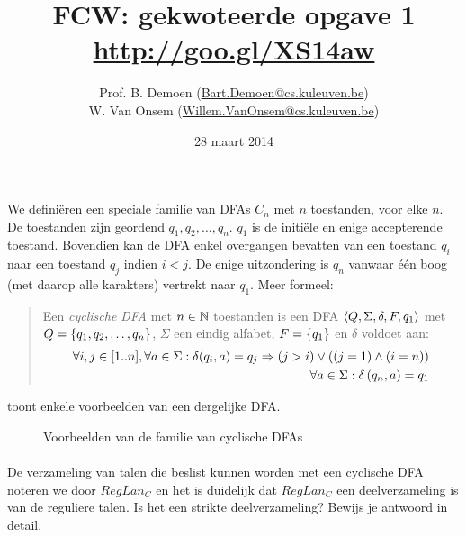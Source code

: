 \documentclass{article}
\title{FCW: gekwoteerde opgave 1\\\url{http://goo.gl/XS14aw}}
\author{Prof. B. Demoen (\url{Bart.Demoen@cs.kuleuven.be})\\ W. Van Onsem (\url{Willem.VanOnsem@cs.kuleuven.be})}
\date{28 maart 2014}
\begin{document}
\maketitle
\richtlijnen{}
\aboutanswers{}
\begin{question}[] We defini\"{e}ren een speciale familie van DFAs
$C_n$ met $n$ toestanden, voor elke $n$. De toestanden zijn geordend
$q_1,q_2,\ldots,q_n$. $q_1$ is de initi\"ele en enige accepterende
toestand. Bovendien kan de DFA enkel overgangen bevatten van een
toestand $q_i$ naar een toestand $q_j$ indien $i<j$. De enige
uitzondering is $q_n$ vanwaar \'{e}\'{e}n boog (met daarop alle
karakters) vertrekt naar $q_1$. Meer formeel:

\vspace{-0.5cm}
\begin{quote}\begin{definition}
Een \emph{cyclische DFA} met $n \in \mathbb{N}$ toestanden is een DFA
$\left\langle Q,\Sigma,\delta,F,q_1 \right\rangle$ met $Q=\left\{ q_1,q_2,\ldots,q_n \right\}$,
$\Sigma$ een eindig alfabet, $F=\left\{ q_1 \right\}$ en $\delta$ voldoet aan:
\begin{eqnarray}
\forall i,j \in [1..n], \forall a \in \Sigma: \delta(q_i,a) = q_j \Rightarrow (j>i) \vee ((j = 1) \wedge (i = n))\\
\forall a\in\Sigma:\delta\left( q_n,a \right)=q_1
\end{eqnarray}
\end{definition}\end{quote}
\begin{example}
 toont enkele voorbeelden van een dergelijke DFA.
\begin{figure}[hbt]
\centering
\caption{Voorbeelden van de familie van cyclische DFAs}
\end{figure}
\end{example}
\paragraph{}

De verzameling van talen die beslist kunnen worden met een cyclische
DFA noteren we door $RegLan_{C}$ en het is duidelijk dat $RegLan_{C}$
een deelverzameling is van de reguliere talen. Is het een strikte
deelverzameling? Bewijs je antwoord in detail.


\end{question}
\end{document}
